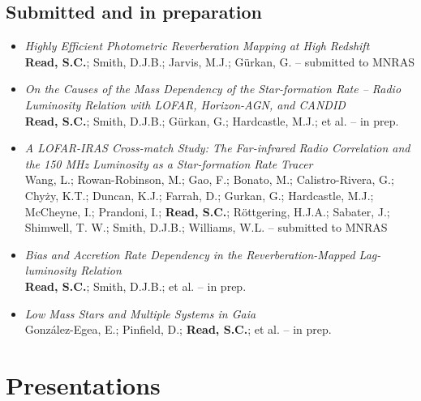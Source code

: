 \documentclass[letterpaper]{twentysecondcv} %
\begin{document}
\begin{publications}
\subsection{Submitted and in preparation}
\begin{itemize}
     \item \textit{Highly Efficient Photometric Reverberation Mapping at High Redshift}\\{\small \textbf{Read, S.C.}; Smith, D.J.B.; Jarvis, M.J.; Gürkan, G. -- submitted to MNRAS}
 \item \textit{On the Causes of the Mass Dependency of the Star-formation Rate -- Radio
Luminosity Relation with LOFAR, Horizon-AGN, and CANDID}\\{\small \textbf{Read, S.C.}; Smith, D.J.B.; Gürkan, G.; Hardcastle, M.J.; et al. -- in prep.}
 \item \textit{A LOFAR-IRAS Cross-match Study: The Far-infrared Radio Correlation and
the 150 MHz Luminosity as a Star-formation Rate Tracer}\\{\small Wang, L.; Rowan-Robinson, M.; Gao, F.; Bonato, M.; Calistro-Rivera, G.;
Chyży, K.T.; Duncan, K.J.; Farrah, D.; Gurkan, G.; Hardcastle, M.J.;
McCheyne, I.; Prandoni, I.; \textbf{Read, S.C.}; Röttgering, H.J.A.;
Sabater, J.; Shimwell, T. W.; Smith, D.J.B.; Williams, W.L. -- submitted to MNRAS}
 \item \textit{Bias and Accretion Rate Dependency in the Reverberation-Mapped
Lag-luminosity Relation}\\{\small \textbf{Read, S.C.}; Smith, D.J.B.; et al. -- in prep.}
 \item \textit{Low Mass Stars and Multiple Systems in Gaia}\\{\small González-Egea, E.; Pinfield, D.; \textbf{Read, S.C.}; et al. -- in prep.}
\end{itemize}

\section{Presentations}
\begin{twentyfull}
\end{twentyfull}
\end{publications}
\end{document}
